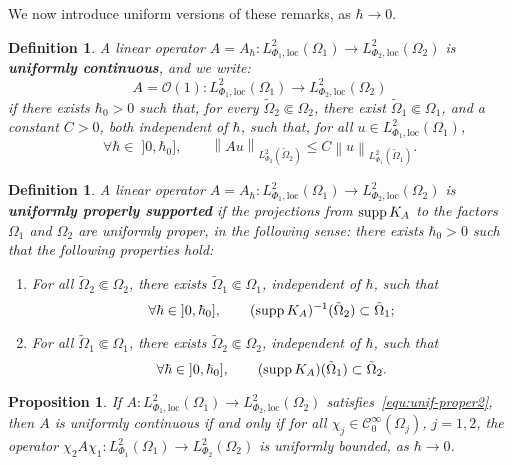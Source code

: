 \documentclass{article}
\newtheorem{prop}[theo]{Proposition}
\newtheorem{defi}[theo]{Definition}
\newcommand{\loc}{\mathrm{loc}}
\newcommand{\norm}[1]{\left\|#1\right\|}
\newcommand{\Cinf}{\mathscr{C}^\infty}
\newcommand{\spt}{\mathop{\textup{supp}}}
\newcommand{\h}{\hbar}
\begin{document}
We now introduce uniform versions of these remarks, as $\h\to 0$.
\begin{defi}\label{defi:unif-cont}
  A linear operator
  $A=A_\h : L_{ \Phi_1,\loc}^{2}(\Omega_1) \to L_{
    \Phi_2,\loc}^{2}(\Omega_2)$
  is \textbf{uniformly continuous}, and we write:
  \[
  A = \mathcal{O}(1): L_{ \Phi_1,\loc}^{2}(\Omega_1) \to L_{
    \Phi_2,\loc}^{2}(\Omega_2)
  \]
  if there exists $\h_0>0$ such that, for every
  $\tilde\Omega_2\Subset\Omega_2$, there exist
  $\tilde\Omega_1\Subset\Omega_1$, and a constant $C>0$, both
  independent of $\h$, such that, for all
  $u\in L^2_{\Phi_1,\loc}(\Omega_1)$,
  \begin{equation}
    \forall \h\in\;]0,\h_0], \qquad 
    \norm{A u}_{L^2_{\Phi_2}(\tilde \Omega_2)} \leq 
    C \norm{u}_{L^2_{\Phi_1}(\tilde \Omega_1)}.
    \label{equ:unif-cont-lphi}
  \end{equation}
\end{defi}
\begin{defi}
  A linear operator
  $A=A_\h : L_{ \Phi_1,\loc}^{2}(\Omega_1) \to L_{
    \Phi_2,\loc}^{2}(\Omega_2)$
  is \textbf{uniformly properly supported} if the projections from
  $\spt K_A$ to the factors $\Omega_1$ and $\Omega_2$ are uniformly
  proper, in the following sense: there exists $\h_0>0$ such that the
  following properties hold:
  \begin{enumerate}
  \item For all $\tilde\Omega_2\Subset\Omega_2$, there exists
    $\tilde \Omega_1\Subset \Omega_1$, independent of $\h$, such that
    \begin{equation}
      \forall \h\in\;]0,\h_0], \qquad 
      (\spt K_A)^{-1}(\tilde \Omega_2) \subset \tilde\Omega_1;
      \label{equ:unif-proper2}    
    \end{equation}

  \item For all $\tilde\Omega_1\Subset\Omega_1$, there exists
    $\tilde \Omega_2\Subset \Omega_2$, independent of $\h$, such that
    \begin{equation}
      \forall \h\in\;]0,\h_0], \qquad
      (\spt K_A) (\tilde\Omega_1) \subset \tilde\Omega_2.
      \label{equ:unif-proper1}
    \end{equation}
  \end{enumerate}
\end{defi}
\begin{prop}
  \label{prop:chi1-chi2}
  If
  $A:L_{ \Phi_1,\loc}^{2}(\Omega_1) \to L_{
    \Phi_2,\loc}^{2}(\Omega_2)$
  satisfies~\eqref{equ:unif-proper2}, then $A$ is uniformly continuous
  if and only if for all $\chi_j\in\Cinf_0(\Omega_j)$, $j=1,2$, the
  operator
  $\chi_2 A \chi_1: L^2_{\Phi_1}(\Omega_1)\to L^2_{\Phi_2}(\Omega_2)$
  is uniformly bounded, as $\h\to 0$.
\end{prop}
\end{document}
